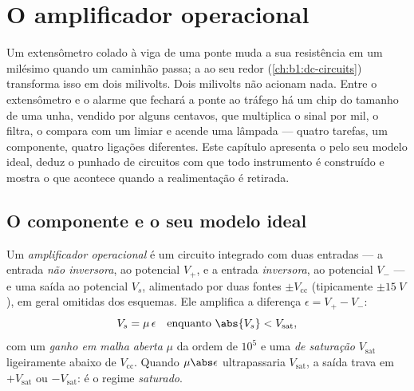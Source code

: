 \chapter{O amplificador operacional}\label{ch:b1:operational-amplifier}

Um extensômetro colado à viga de uma ponte muda a sua resistência em um
milésimo quando um caminhão passa; a  ao seu redor
(\cref{ch:b1:dc-circuits}) transforma isso em dois milivolts. Dois
milivolts não acionam nada. Entre o extensômetro e o alarme que fechará
a ponte ao tráfego há um chip do tamanho de uma unha, vendido
por alguns centavos, que multiplica o sinal por mil, o filtra,
o compara com um limiar e acende uma lâmpada --- quatro tarefas, um
componente, quatro ligações diferentes. Este capítulo apresenta o
 pelo seu modelo ideal, deduz o punhado de
circuitos com que todo instrumento é construído e mostra o que acontece
quando a realimentação é retirada.

\section{O componente e o seu modelo ideal}

\begin{definition}\label{def:b1:operational-amplifier:opamp}
Um \emph{amplificador operacional} é um circuito integrado com duas
entradas --- a entrada \emph{não inversora}, ao potencial $V_+$, e a
entrada \emph{inversora}, ao potencial $V_-$ --- e uma saída ao potencial $V_s$,
alimentado por duas fontes $\pm V_{\mathrm{cc}}$ (tipicamente
$\pm\qty{15}{V}$), em geral omitidas dos esquemas. Ele amplifica
a diferença $\epsilon = V_+ - V_-$:
\[
V_s = \mu\,\epsilon \quad\text{enquanto } \abs{V_s} < V_{\mathrm{sat}},
\]
com um \emph{ganho em malha aberta} $\mu$ da ordem de $10^5$ e uma
\emph{ de saturação} $V_{\mathrm{sat}}$ ligeiramente abaixo de
$V_{\mathrm{cc}}$. Quando $\mu\abs\epsilon$ ultrapassaria $V_{\mathrm{sat}}$,
a saída trava em $+V_{\mathrm{sat}}$ ou $-V_{\mathrm{sat}}$: é o
regime \emph{saturado}.
\end{definition}

